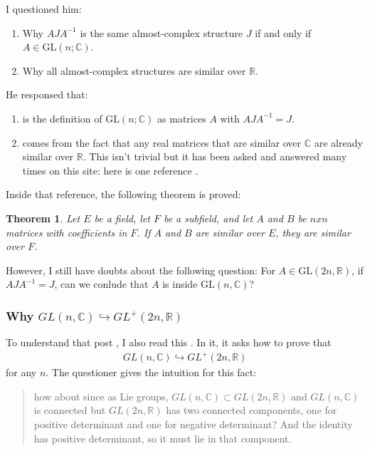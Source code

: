 \documentclass{article}
\numberwithin{equation}{subsection} %
\newtheorem{thm}{Theorem}[section]
\theoremstyle{definition}
\begin{document}
        I questioned him:
        \begin{enumerate}
            \item Why $AJA^{-1}$ is the same almost-complex structure 
                $J$ if and only if $A\in \mathrm{GL}(n;\mathbb{C})$. 
            \item Why all almost-complex structures are similar over 
                $\mathbb{R}$.
        \end{enumerate}
        He responsed that:
        \begin{enumerate}
            \item is the definition of $\mathrm{GL}(n;\mathbb{C})$
                as matrices $A$ with $AJA^{-1}=J$.
            \item comes from the fact that any real matrices that are 
                similar over $\mathbb{C}$ are already similar over 
                $\mathbb{R}$. This isn't trivial but it has been asked 
                and answered many times on this site: here is one 
                reference \cite{math.se_4}.
        \end{enumerate}

        Inside that reference, the following theorem is proved:

        \begin{thm}
            Let $E$ be a field, let $F$ be a subfield, and let $A$ and
            $B$ be $nxn$ matrices with coefficients in $F$. If $A$ and
            $B$ are similar over $E$, they are similar over $F$.
        \end{thm}

        However, I still have doubts about the following question:
        For $A\in \mathrm{GL}(2n,\mathbb{R})$, if $AJA^{-1}=J$, can we
        conlude that $A$ is inside $\mathrm{GL}(n,\mathbb{C})$?
        \subsubsection{Why \texorpdfstring{
                $GL(n, \mathbb{C}) \hookrightarrow GL^+(2n,\mathbb{R})$
                }{}
            }
        
        To understand that post \cite{math.se_1}, I also read this
        \cite{math.se_2}. In it, it asks how to prove that 
        \begin{align}
            \label{eq:sec.1.1.2_why_glnc_injectInto_positive_comp}
            GL(n, \mathbb{C}) \hookrightarrow GL^+(2n,\mathbb{R})
        \end{align}
        for any $n$. The questioner gives the intuition for this fact:
        \begin{quote}
            how about since as Lie groups, $GL(n,\mathbb{C}) 
            \subset GL(2n, \mathbb{R})$ and $GL(n,\mathbb{C})$ is connected 
            but $GL(2n, \mathbb{R})$ has two connected components, one for 
            positive determinant and one for negative determinant? And the 
            identity has positive determinant, so it must lie in that 
            component.
        \end{quote}
        
\end{document}
